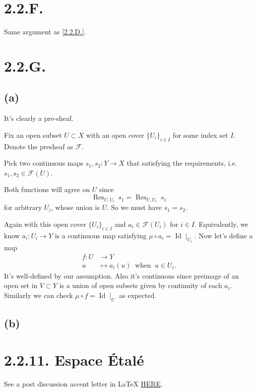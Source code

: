 \section{2.2.F.}
Same argument as \ref{2.2.D.}.

\section{2.2.G.}

\subsection{(a)}
It's clearly a pre-sheaf.

Fix an open subset $U\subset X$ with an open cover $\{U_i\}_{i\in I}$ for some index set $I$. Denote the presheaf as $\mathscr F$.

Pick two continuous maps $s_1,s_2:Y\to X$ that satisfying the requirements, i.e. $s_1,s_2\in\mathscr F(U)$.

Both functions will agree on $U$ since 
\[\operatorname{Res}_{U,U_i}~ s_1=\operatorname{Res}_{U,U_i}~ s_1\] for arbitrary $U_i$, whose union is $U$. So we must have $s_1=s_2$.

Again with this open cover $\{U_i\}_{i\in I}$ and $a_i\in \mathscr F(U_i)$ for $i\in I$. Equivalently, we know $a_i:U_i\to Y$ is a continuous map satisfying $\mu\circ a_i=\operatorname{Id}\mid_{U_i}$.
Now let's define a map 
\begin{align*}
    f:U &\to Y\\
    u &\mapsto a_i(u) ~\text{ when }~ u\in U_i.     
\end{align*}It's well-defined by our assumption. Also it's continuous since preimage of an open set in $V\subset Y$ is a union of open subsets given by continuity of each $a_i$. Similarly we can check $\mu\circ f=\operatorname{Id}\mid_{U}$ as expected.

\subsection{(b)}



\section{2.2.11. Espace \'Etal\'e}
See a post discussion accent letter in LaTeX \href{https://tex.stackexchange.com/questions/8857/how-to-type-special-accented-letters-in-latex}{HERE}.

